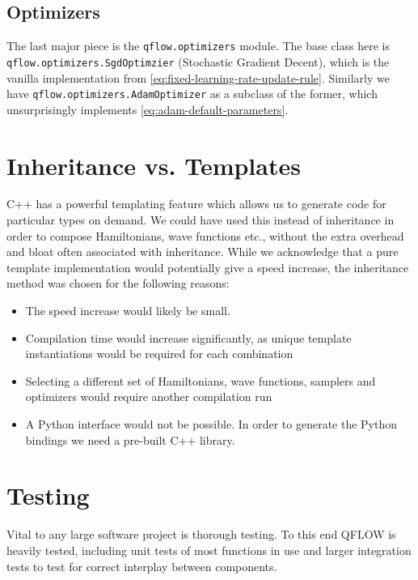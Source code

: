 \documentclass[Thesis.tex]{subfiles}
\begin{document}
\subsection{Optimizers}

The last major piece is the \texttt{qflow.optimizers} module. The base class
here is \texttt{qflow.\-optimizers.\-SgdOptimzier} (Stochastic Gradient Decent),
which is the vanilla implementation from
\cref{eq:fixed-learning-rate-update-rule}. Similarly we have
\texttt{qflow.\-optimizers.\-AdamOptimizer} as a subclass of the former, which
unsurprisingly implements \cref{eq:adam-default-parameters}.


\section{Inheritance vs. Templates}

C++ has a powerful templating feature which allows us to generate code for
particular types on demand. We could have used this instead of inheritance in
order to compose Hamiltonians, wave functions etc., without the extra overhead
and bloat often associated with inheritance. While we acknowledge that a pure
template implementation would potentially give a speed increase, the inheritance
method was chosen for the following reasons:

\begin{itemize}
\item The speed increase would likely be small.
\item Compilation time would increase significantly, as unique template
  instantiations would be required for each combination
\item Selecting a different set of Hamiltonians, wave functions, samplers and
  optimizers would require another compilation run
\item A Python interface would not be possible. In order to generate the
  Python bindings we need a pre-built C++ library.
\end{itemize}

\section{Testing}

Vital to any large software project is thorough testing. To this end QFLOW is
heavily tested, including unit tests of most functions in use and larger
integration tests to test for correct interplay between components.
\end{document}
